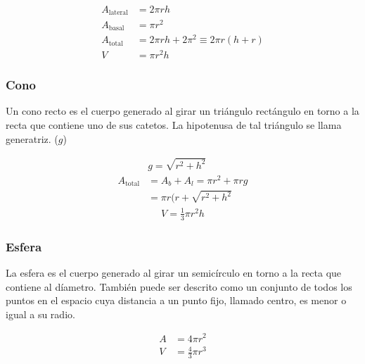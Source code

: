 \begin{equation*}
    \begin{split} 
    A_{\text{lateral}} &= 2\pi rh\\
    A_{\text{basal}} &= \pi r^2\\
    A_{\text{total}} &= 2\pi rh + 2\pi ^2 \equiv 2\pi r(h+r)\\
    V &= \pi r^2h
    \end{split}
\end{equation*}
\subsubsection{Cono}
Un cono recto es el cuerpo generado al girar un triángulo rectángulo en torno a la recta que contiene uno de sus catetos. La hipotenusa de tal triángulo se llama generatriz. ($g$)

\begin{equation*}
    \begin{split} 
        &g = \sqrt{r^2 + h^2}\\
        A_{\text{total}} &= A_b + A_l = \pi r^2 + \pi rg \\
        &= \pi r(r + \sqrt{r^2 + h^2}
    \end{split}
\end{equation*}
\begin{equation*}
    \begin{aligned} 
        V = \frac{1}{3}\pi r^2h
    \end{aligned}
\end{equation*}
\subsubsection{Esfera}
La esfera es el cuerpo generado al girar un semicírculo en torno a la recta que contiene al díametro. También puede ser descrito como un conjunto de todos los puntos en el espacio cuya distancia a un punto fijo, llamado centro, es menor o igual a su radio.

\begin{equation*}
    \begin{split} 
        A &= 4\pi r^2\\
        V &= \frac{4}{3} \pi r^3
    \end{split}
\end{equation*}
\vfill\null\columnbreak